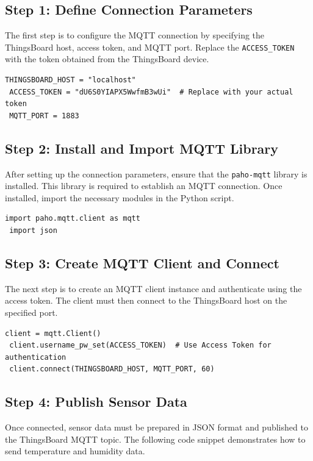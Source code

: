 \documentclass[a4paper,12pt]{report}
\begin{document}
 \subsection{Step 1: Define Connection Parameters}
 The first step is to configure the MQTT connection by specifying the ThingsBoard host, access token, and MQTT port. Replace the \texttt{ACCESS\_TOKEN} with the token obtained from the ThingsBoard device.
 
 \begin{lstlisting}[caption={Connection Parameters as Environment Variables}]
 THINGSBOARD_HOST = "localhost"
 ACCESS_TOKEN = "dU6S0YIAPX5WwfmB3wUi"  # Replace with your actual token
 MQTT_PORT = 1883
 \end{lstlisting}
 
 \subsection{Step 2: Install and Import MQTT Library}
 After setting up the connection parameters, ensure that the \texttt{paho-mqtt} library is installed. This library is required to establish an MQTT connection. Once installed, import the necessary modules in the Python script.
 
 \begin{lstlisting}[caption={Importing MQTT using Python}]
 import paho.mqtt.client as mqtt
 import json
 \end{lstlisting}
 
 \subsection{Step 3: Create MQTT Client and Connect}
 The next step is to create an MQTT client instance and authenticate using the access token. The client must then connect to the ThingsBoard host on the specified port.
 
 \begin{lstlisting}[caption={Connecting MQTT to ThingsBoard using Device Token}]
 client = mqtt.Client()
 client.username_pw_set(ACCESS_TOKEN)  # Use Access Token for authentication
 client.connect(THINGSBOARD_HOST, MQTT_PORT, 60)
 \end{lstlisting}
 
 \subsection{Step 4: Publish Sensor Data}
 Once connected, sensor data must be prepared in JSON format and published to the ThingsBoard MQTT topic. The following code snippet demonstrates how to send temperature and humidity data.
 
\end{document}
